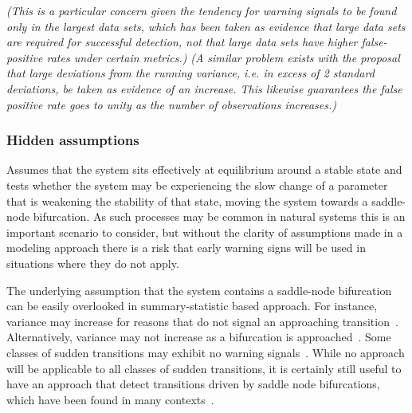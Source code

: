 \documentclass[authoryear,preprint,11pt]{elsarticle}
\newcommand{\cb}[1]{{\it \color{darkgreen} (#1)}}
\begin{document}
\cb{This is a particular concern given the tendency for warning signals to be found only in the largest data sets, 
which has been taken as evidence that large data sets are required for successful detection,
not that large data sets have higher false-positive rates under certain metrics.}
\cb{A similar problem exists with the proposal that large deviations from the running variance,
i.e. in excess of 2 standard deviations, be taken as evidence of an increase.
This likewise guarantees the false positive rate goes to unity as the number of observations increases.}



\subsubsection*{Hidden assumptions}
Assumes that the system sits effectively at equilibrium around a stable state  
and tests whether the system may be experiencing the slow change of a parameter that is weakening the stability of that state,
moving the system towards a saddle-node bifurcation.  
As such processes may be common in natural systems this is an important scenario to consider,
but without the clarity of assumptions made in a modeling approach there is a risk that
early warning signs will be used in situations where they do not apply.  


The underlying assumption that the system contains a saddle-node bifurcation
can be easily overlooked in summary-statistic based approach.  
For instance, variance may increase for reasons that 
do not signal an approaching transition~\citep{Schreiber2003, Schreiber2008}.
Alternatively, variance may not increase as a bifurcation is approached~\citep{Livina2012, Dakos2011a}.
Some classes of sudden transitions may exhibit no warning signals~\cite{Hastings2010}.   
While no approach will be applicable to all classes of sudden transitions,
it is certainly still useful to have an approach that detect transitions driven by 
saddle node bifurcations, which have been found in many contexts~\citep[\emph{e.g.}, see][]{Scheffer2001}.  

\end{document}

